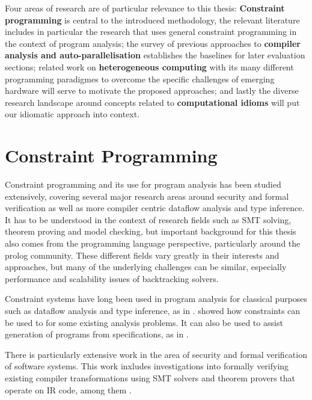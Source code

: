     Four areas of research are of particular relevance to this thesis:
    {\bf Constraint programming} is central to the introduced methodology, the
    relevant literature includes in particular the research that uses general
    constraint programming in the context of program analysis;
    the survey of previous approaches to
    {\bf compiler analysis and auto-parallelisation}
    establishes the baselines for later evaluation sections;
    related work on {\bf heterogeneous computing} with its many different
    programming paradigmes to overcome the specific challenges of emerging
    hardware will serve to motivate the proposed approaches;
    and lastly the diverse research landscape around concepts related to
    {\bf computational idioms} will put our idiomatic approach into context.

\section{Constraint Programming}

    Constraint programming and its use for program analysis has been studied
    extensively, covering several major research areas around security and
    formal verification as well as more compiler centric dataflow analysis and
    type inference.
    It has to be understood in the context of research fields such as SMT
    solving, theorem proving and model checking, but important background for
    this thesis also comes from the programming language perspective,
    particularly around the prolog community.
    These different fields vary greatly in their interests and approaches, but
    many of the underlying challenges can be similar, especially performance and
    scalability issues of backtracking solvers.

    Constraint systems have long been used in program analysis for classical
    purposes such as dataflow analysis and type inference, as in
    \citet{Aiken:1999:ISC:339853.339897}.
    \citet{Gulwani:2008:PAC:1375581.1375616} showed how constraints can be
    used to for some  existing analysis problems.
    It can also be used to assist generation of programs from specifications,
    as in \citet{Srivastava:2010:PVP:1707801.1706337}.

    There is particularly extensive work in the area of security and formal
    verification of software systems.
    This work inxludes investigations into formally verifying existing compiler
    transformations using SMT solvers and theorem provers that operate on IR
    code, among them \citet{Zhao:2012:FLI:2103656.2103709}.

